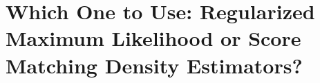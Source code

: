 %
%
%
%


\section{Which One to Use: Regularized Maximum Likelihood or Score Matching Density Estimators?}\label{section-which-one-to-use}


